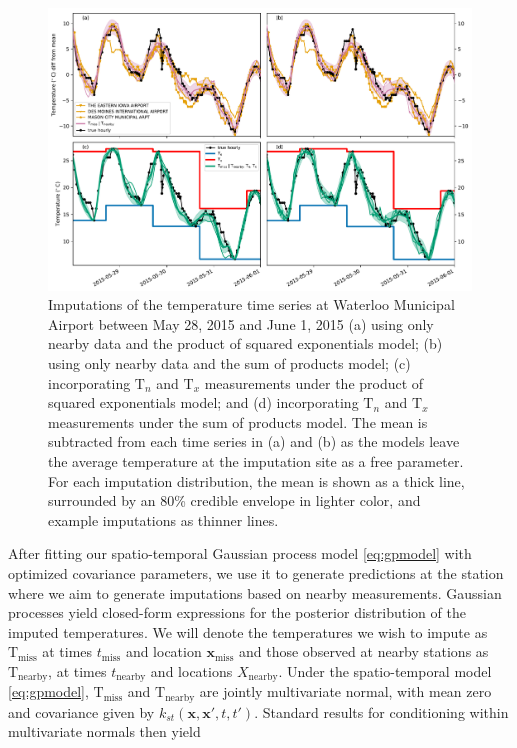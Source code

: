 \documentclass[letter]{article}
\makeatletter
\def\maxwidth{\ifdim\Gin@nat@width>\linewidth\linewidth
\else\Gin@nat@width\fi}
\let\Oldincludegraphics\includegraphics
\renewcommand{\includegraphics}[1]{\Oldincludegraphics[width=0.98\maxwidth]{#1}}
\newcommand{\T}{\mathrm{T}}
\newcommand{\Tn}{\T_{n}}
\newcommand{\Tx}{\T_{x}}
\newcommand{\xvec}{\mathbold{x}}
\newcommand{\miss}{\mathrm{miss}}
\newcommand{\obs}{\mathrm{nearby}}
\makeatother
\begin{document}
\label{sec:predict_nearby}
        \begin{figure}
\centering
\includegraphics{../figures/imputations_2x2.pdf}
\caption{\label{fig:imputations_2x2}Imputations of the temperature time series at Waterloo Municipal Airport between May 28, 2015 and June 1, 2015 (a) using only nearby data and the product of squared exponentials model; (b) using only nearby data and the sum of products model; (c) incorporating \(\Tn\) and \(\Tx\) measurements under the product of squared exponentials model; and (d) incorporating \(\Tn\) and \(\Tx\) measurements under the sum of products model. The mean is subtracted from each time series in (a) and (b) as the models leave the average temperature at the imputation site as a free parameter. For each imputation distribution, the mean is shown as a thick line, surrounded by an 80\% credible envelope in lighter color, and example imputations as thinner lines.}
\end{figure}
    


        After fitting our spatio-temporal Gaussian process model \eqref{eq:gpmodel} with optimized covariance parameters, we use it to generate predictions at the station where we aim to generate imputations based on nearby measurements.
Gaussian processes yield closed-form expressions for the posterior distribution of the imputed temperatures.
We will denote the temperatures we wish to impute as \(\T_\miss{}\) at times \(t_\miss\) and location \(\xvec_\miss\) and those observed at nearby stations as \(\T_\obs{}\), at times \(t_\obs\) and locations \(X_\obs\).
Under the spatio-temporal model \eqref{eq:gpmodel}, \(\T_\miss\) and \(\T_\obs\) are jointly multivariate normal, with mean zero and covariance given by \(k_{st}(\xvec,\xvec',t,t')\).
Standard results for conditioning within multivariate normals then yield
\end{document}

